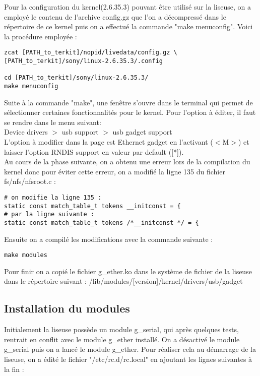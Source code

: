Pour la configuration du kernel(2.6.35.3) pouvant être utilisé sur la liseuse, on a employé le contenu de l'archive config.gz que l'on a décompressé dans le répertoire de ce kernel puis on a effectué la commande "make menuconfig". Voici la procédure employée :

\begin{lstlisting}
zcat [PATH_to_terkit]/nopid/livedata/config.gz \
[PATH_to_terkit]/sony/linux-2.6.35.3/.config

cd [PATH_to_terkit]/sony/linux-2.6.35.3/
make menuconfig
\end{lstlisting}

Suite à la commande "make", une fenêtre s'ouvre dans le terminal qui permet de sélectionner certaines fonctionnalités pour le kernel. Pour l'option à éditer, il faut se rendre dans le menu suivant: \\
Device drivers $>$ usb support $>$ usb gadget support \\
L'option à modifier dans la page est Ethernet gadget en l'activant ($<$M$>$) et laisser l'option RNDIS support en valeur par default ([*]).\\

Au cours de la phase suivante, on a obtenu une erreur lors de la compilation du kernel donc pour éviter cette erreur, on a modifié la ligne 135 du fichier fs/nfs/nfsroot.c :

\begin{lstlisting}
# on modifie la ligne 135 :
static const match_table_t tokens __initconst = {
# par la ligne suivante :
static const match_table_t tokens /*__initconst */ = { 
\end{lstlisting} 

Ensuite on a compilé les modifications avec la commande suivante :

\begin{lstlisting}
make modules
\end{lstlisting}

Pour finir on a copié le fichier g_ether.ko dans le système de fichier de la liseuse dans le répertoire suivant : /lib/modules/[version]/kernel/drivers/usb/gadget
 
\subsection{Installation du modules}

Initialement la liseuse possède un module g_serial, qui après quelques tests, rentrait en conflit avec le module g_ether installé. On a désactivé le module g_serial puis on  a lancé le module g_ether. Pour réaliser cela au démarrage de la liseuse, on a édité le fichier "/etc/rc.d/rc.local" en ajoutant les lignes suivantes à la fin : 


